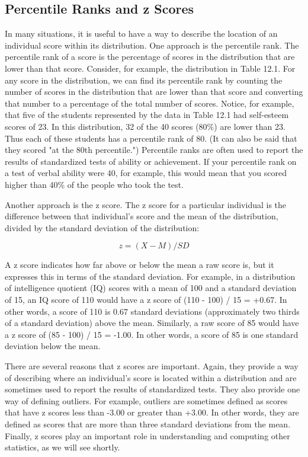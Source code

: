\subsection{Percentile Ranks and z Scores}

In many situations, it is useful to have a way to describe the location of an individual score within its distribution. One approach is the percentile rank. The percentile rank of a score is the percentage of scores in the distribution that are lower than that score. Consider, for example, the distribution in Table 12.1. For any score in the distribution, we can find its percentile rank by counting the number of scores in the distribution that are lower than that score and converting that number to a percentage of the total number of scores. Notice, for example, that five of the students represented by the data in Table 12.1 had self-esteem scores of 23. In this distribution, 32 of the 40 scores (80\%) are lower than 23. Thus each of these students has a percentile rank of 80. (It can also be said that they scored "at the 80th percentile.") Percentile ranks are often used to report the results of standardized tests of ability or achievement. If your percentile rank on a test of verbal ability were 40, for example, this would mean that you scored higher than 40\% of the people who took the test.

Another approach is the z score. The z score for a particular individual is the difference between that individual's score and the mean of the distribution, divided by the standard deviation of the distribution:

\begin{equation}
z = (X-M)/SD
\end{equation}

A z score indicates how far above or below the mean a raw score is, but it expresses this in terms of the standard
deviation. For example, in a distribution of intelligence quotient (IQ) scores with a mean of 100 and a standard deviation of 15, an IQ score of 110 would have a z score of (110 - 100) / 15 = +0.67. In other words, a score of 110 is 0.67 standard deviations (approximately two thirds of a standard deviation) above the mean. Similarly, a raw score of 85 would have a z score of (85 - 100) / 15 = -1.00. In other words, a score of 85 is one standard deviation below the mean.

There are several reasons that z scores are important. Again, they provide a way of describing where an individual's score is located within a distribution and are sometimes used to report the results of standardized tests. They also provide one way of defining outliers. For example, outliers are sometimes defined as scores that have z scores less than -3.00 or greater than +3.00. In other words, they are defined as scores that are more than three standard deviations from the mean. Finally, z scores play an important role in understanding and computing other statistics, as we will see shortly.

